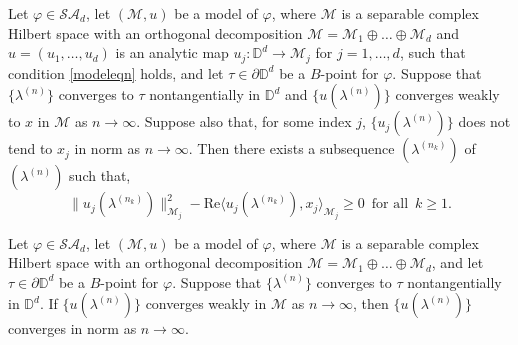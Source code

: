 \documentclass[10pt,a4paper]{amsart}
\begin{document}
\begin{lemma}\label{ujnotxj}
Let $\varphi\in\mathcal{SA}_{d}$, let $(\mathcal{M},u)$ be a model of $\varphi$, where  $\mathcal{M}$ is a separable complex Hilbert space with an orthogonal decomposition $\mathcal{M}=\mathcal{M}_{1}\oplus\hdots\oplus\mathcal{M}_{d}$ and $u=(u_1, \dots, u_d)$ is an analytic map  $u_j: \mathbb{D}^{d} \to \mathcal{M}_{j} $ for $j =1, \dots, d$, such that condition 
\eqref{modeleqn}    holds, and let $\tau\in\partial\mathbb{D}^{d}$ be a $B$-point for $\varphi$. Suppose that $\{\lambda^{(n)}\}$ converges to $\tau$ nontangentially in $\mathbb{D}^{d}$ and $\{u(\lambda^{(n)})\}$ converges weakly to $x$ in $\mathcal{M}$ as $n\rightarrow \infty$.
Suppose also that, for some index $j$,  $\{u_j(\lambda^{(n)})\}$ does not tend to $x_j$  in norm as $n\rightarrow \infty$.
Then there exists a   subsequence $(\lambda^{(n_k)})$ of $(\lambda^{(n)})$ such that, 
\begin{equation} \label{lemma-uj-0}  \|u_{j}(\lambda^{(n_k)})\|_{\mathcal{M}_{j}}^{2}-\mathrm{Re} \langle u_{j}(\lambda^{(n_k)}),x_{j}\rangle_{\mathcal{M}_{j}} \geq 0 \;\ \text{for all} \; \ k \ge 1.
\end{equation}
\end{lemma}

\begin{proposition}\label{prop5.8cara}
Let $\varphi\in\mathcal{SA}_{d}$, let $(\mathcal{M},u)$ be a model of $\varphi$,  where  $\mathcal{M}$ is a separable complex Hilbert space with an orthogonal decomposition $\mathcal{M}=\mathcal{M}_{1}\oplus\hdots\oplus\mathcal{M}_{d}$, 
 and let $\tau\in\partial\mathbb{D}^{d}$ be a $B$-point for $\varphi$. Suppose that $\{\lambda^{(n)}\}$ converges to $\tau$ nontangentially in $\mathbb{D}^{d}$. If $\{u(\lambda^{(n)})\}$ converges weakly in $\mathcal{M}$ as $n\rightarrow \infty$, then $\{u(\lambda^{(n)})\}$ converges in norm as $n\rightarrow \infty$.
\end{proposition}
\end{document}
